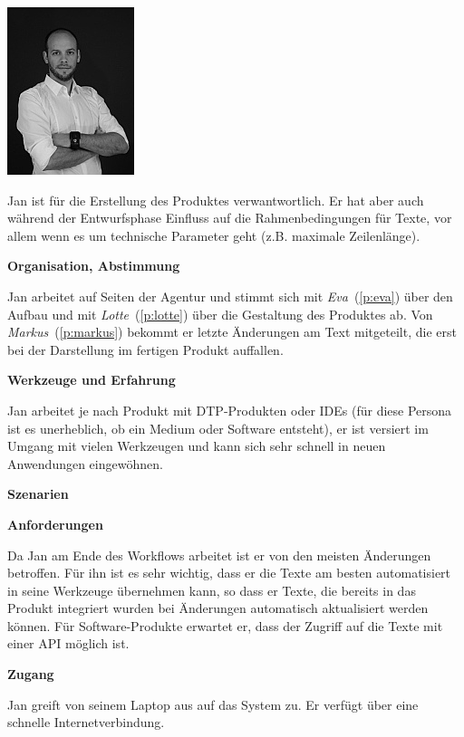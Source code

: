 \begin{multicols}{2}

\begin{center}
\includegraphics[width=0.5\columnwidth]{media/jan.jpg}
\end{center}


Jan ist für die Erstellung des Produktes verwantwortlich. Er hat aber auch während der Entwurfsphase Einfluss auf die Rahmenbedingungen für Texte, vor allem wenn es um technische Parameter geht (z.B. maximale Zeilenlänge).

\textbf{Organisation, Abstimmung}

Jan arbeitet auf Seiten der Agentur und stimmt sich mit \emph{Eva}~(\ref{p:eva}) über den Aufbau und mit \emph{Lotte}~(\ref{p:lotte}) über die Gestaltung des Produktes ab. Von \emph{Markus}~(\ref{p:markus}) bekommt er letzte Änderungen am Text mitgeteilt, die erst bei der Darstellung im fertigen Produkt auffallen.

\textbf{Werkzeuge und Erfahrung}

Jan arbeitet je nach Produkt mit DTP-Produkten oder IDEs (für diese Persona ist es unerheblich, ob ein Medium oder Software entsteht), er ist versiert im Umgang mit vielen Werkzeugen und kann sich sehr schnell in neuen Anwendungen eingewöhnen.

\columnbreak

\textbf{Szenarien}

\textbf{Anforderungen}

Da Jan am Ende des Workflows arbeitet ist er von den meisten Änderungen betroffen. Für ihn ist es sehr wichtig, dass er die Texte am besten automatisiert in seine Werkzeuge übernehmen kann, so dass er Texte, die bereits in das Produkt integriert wurden bei Änderungen automatisch aktualisiert werden können. Für Software-Produkte erwartet er, dass der Zugriff auf die Texte mit einer API möglich ist.

\textbf{Zugang}

Jan greift von seinem Laptop aus auf das System zu. Er verfügt über eine schnelle Internetverbindung.

\end{multicols}

